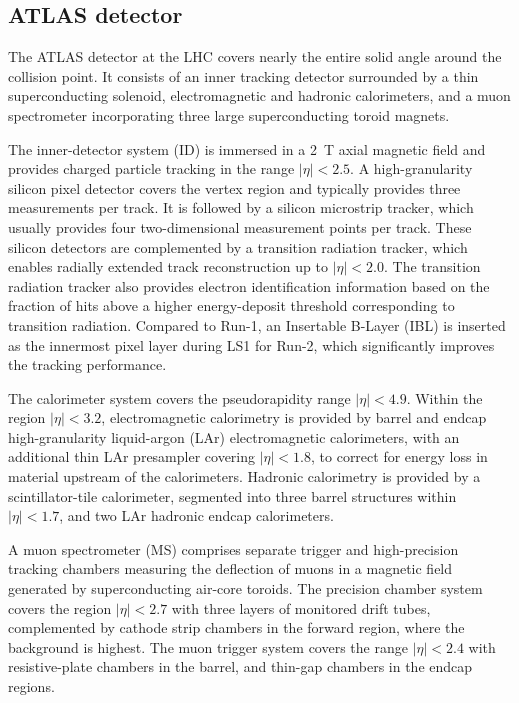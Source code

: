 \subsection{ATLAS detector}
\label{sec:detector}

The ATLAS detector \cite{PERF-2007-01} at the LHC covers nearly the entire solid angle around the collision point. It consists of an inner tracking detector surrounded by a thin superconducting solenoid, electromagnetic and hadronic calorimeters, and a muon spectrometer incorporating three large superconducting toroid magnets.

The inner-detector system (ID) is immersed in a \SI{2}{T} axial magnetic field and provides charged particle tracking in the range $| \eta | < 2.5$. A high-granularity silicon pixel detector covers the vertex region and typically provides three measurements per track. It is followed by a silicon microstrip tracker, which usually provides four two-dimensional measurement points per track. These silicon detectors are complemented by a transition radiation tracker, which enables radially extended track reconstruction up to $| \eta | < 2.0$. The transition radiation tracker also provides electron identification information based on the fraction of hits above a higher energy-deposit threshold corresponding to transition radiation. Compared to Run-1, an Insertable B-Layer \cite{IBL} (IBL) is inserted as the innermost pixel layer during LS1 for Run-2, which significantly improves the tracking performance.

The calorimeter system covers the pseudorapidity range $| \eta | < 4.9$. Within the region $| \eta | < 3.2$, electromagnetic calorimetry is provided by barrel and endcap high-granularity liquid-argon (LAr) electromagnetic calorimeters, with an additional thin LAr presampler covering $| \eta | < 1.8$, to correct for energy loss in material upstream of the calorimeters. Hadronic calorimetry is provided by a scintillator-tile calorimeter, segmented into three barrel structures within $| \eta | < 1.7$, and two LAr hadronic endcap calorimeters.

A muon spectrometer (MS) comprises separate trigger and high-precision tracking chambers measuring the deflection of muons in a magnetic field generated by superconducting air-core toroids. The precision chamber system covers the region $| \eta |< 2.7$ with three layers of monitored drift tubes, complemented by cathode strip chambers in the forward region, where the background is highest. The muon trigger system covers the range $| \eta | < 2.4$ with resistive-plate chambers in the barrel, and thin-gap chambers in the endcap regions.

